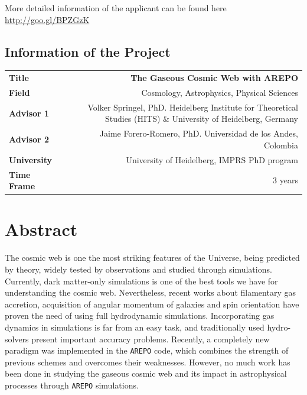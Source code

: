 \documentclass[a4,useAMS,usenatbib,usegraphicx,12pt]{article}
\begin{document}
\vspace{10pt}

More detailed information of the applicant can be found here \url{http://goo.gl/BPZGzK}

\vspace{15pt}  

\subsection*{Information of the Project}
\begin{tabular}{L!{\VRule}R}
\bf Title		& \bf The Gaseous Cosmic Web with AREPO\\
\bf Field		& Cosmology, Astrophysics, Physical Sciences \\
\bf Advisor 1	& Volker Springel, PhD. Heidelberg Institute for Theoretical Studies (HITS) \& University of Heidelberg, Germany \\
\bf Advisor 2	& Jaime Forero-Romero, PhD. Universidad de los Andes, Colombia \\
\bf University	& University of Heidelberg, IMPRS PhD program \\
\bf Time Frame	& 3 years \\
\end{tabular}
\normalsize


\section{Abstract}


The cosmic web is one the most striking features of the Universe, being predicted
by theory, widely tested by observations and studied through simulations. 
Currently, dark matter-only simulations is one of the best tools we have for 
understanding the cosmic web. Nevertheless, recent works about filamentary gas 
accretion, acquisition of angular momentum of galaxies and spin orientation have
proven the need of using full hydrodynamic simulations. Incorporating gas dynamics
in simulations is far from an easy task, and traditionally used hydro-solvers
present important accuracy problems. Recently, a completely new paradigm was 
implemented in the \texttt{AREPO} code, which combines the strength of previous
schemes and overcomes their weaknesses. However, no much work has been done in 
studying the gaseous cosmic web and its impact in astrophysical processes through
\texttt{AREPO} simulations.
\end{document}
